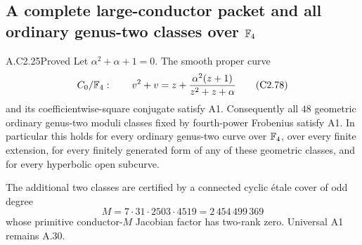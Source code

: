 \subsection{A complete large-conductor packet and all ordinary genus-two classes over \texorpdfstring{$\mathbb F_4$}{F4}}

\begin{claim}{A.C2.25}{Proved}
Let $\alpha^2+\alpha+1=0$. The smooth proper curve
\[
 C_0/\mathbb F_4:\qquad
 v^2+v=z+\frac{\alpha^2(z+1)}{z^2+z+\alpha}                 \tag{C2.78}
\]
and its coefficientwise-square conjugate satisfy A1.
Consequently all $48$ geometric ordinary genus-two
moduli classes fixed by fourth-power Frobenius
satisfy A1. In particular this holds for every
ordinary genus-two curve over $\mathbb F_4$, over every
finite extension, for every finitely generated
form of any of these geometric classes, and
for every hyperbolic open subcurve.

The additional two classes are certified by a
connected cyclic \'etale cover of odd degree
\[
 M=7\cdot31\cdot2503\cdot4519=2\,454\,499\,369             \tag{C2.79}
\]
whose primitive conductor-$M$ Jacobian factor
has two-rank zero. Universal A1 remains A.30.
\end{claim}
